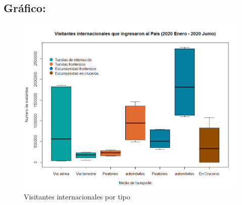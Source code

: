 \documentclass[]{article}
\begin{document}
\subsection*{Gráfico:}
	\begin{figure}[h]
    	\centering
    	\includegraphics[scale=.5]{Turismo}
    	\caption{Visitantes internacionales por tipo}
    	\label{fig:mesh}
	\end{figure}

\printbibliography[title={Referencias}]
\end{document}
